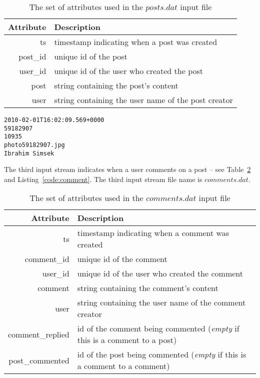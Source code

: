\documentclass{sig-alternate}
\begin{document}
\begin{table}[ht]
	\caption{The set of attributes used in the $posts.dat$ input file}
	\centering 
	\begin{tabular}{r p{5.2cm}}
		\toprule
		Attribute		&	 Description\\
		\midrule
		ts			&	timestamp indicating when a post was created\\[2ex]
		post\_id	&	unique id of the post\\[2ex]
		user\_id	&	unique id of the user who created the post\\[2ex]		
		post		& 	string containing the post's content\\[2ex]		
		user		&   string containing the user name of the post creator\\[2ex]
		\bottomrule 
	\end{tabular}
	\label{table:post}
\end{table}

\lstset{}
\begin{lstlisting}[float=ht,caption={First line from the $posts.dat$ file -- one attribute per line of listing},label={code:post}]
2010-02-01T16:02:09.569+0000
59182907
10935
photo59182907.jpg
Ibrahim Simsek
\end{lstlisting}

The third input stream indicates when a user comments on a post -- see Table~\ref{table:comment} and Listing~\ref{code:comment}. The third input stream file name is $comments.dat$.

\begin{table}[ht]
	\caption{The set of attributes used in the $comments.dat$ input file}
	\centering 
	\begin{tabular}{r p{5.2cm}}
		\toprule
		Attribute		&	 Description\\
		\midrule
		ts			&	timestamp indicating when a comment was created\\[2ex]
		comment\_id	&	unique id of the comment\\[2ex]
		user\_id	&	unique id of the user who created the comment\\[2ex]		
		comment		& 	string containing the comment's content\\[2ex]		
		user		&   string containing the user name of the comment creator\\[2ex]
		comment\_replied		&   id of the comment being commented (\textit{empty} if this is a comment to a post)\\[2ex]
		post\_commented		&   id of the post being commented (\textit{empty} if this is a comment to a comment)\\[2ex]
		\bottomrule 
	\end{tabular}
	\label{table:comment}
\end{table}
\end{document}

